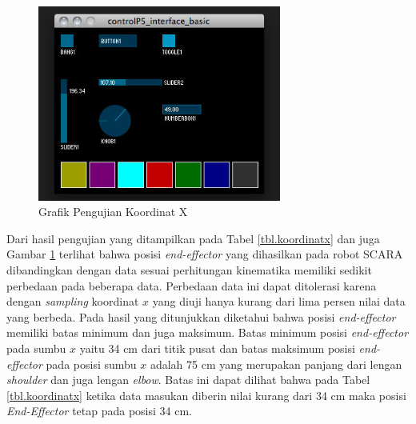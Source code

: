 	\begin{figure}[H]
	\centering
	\includegraphics[width=8cm]{gambar/controlp5.jpg}
	\caption{Grafik Pengujian Koordinat X}
	\label{pic.koordinatx}
\end{figure}

Dari hasil pengujian yang ditampilkan pada Tabel \ref{tbl.koordinatx} dan juga Gambar \ref{pic.koordinatx} terlihat bahwa posisi \textit{end-effector} yang dihasilkan pada robot SCARA dibandingkan dengan data sesuai perhitungan kinematika memiliki sedikit perbedaan pada beberapa data. Perbedaan data ini dapat ditolerasi karena dengan \textit{sampling} koordinat $x$ yang diuji hanya kurang dari lima persen nilai data yang berbeda. Pada hasil yang ditunjukkan diketahui bahwa posisi \textit{end-effector} memiliki batas minimum dan juga maksimum. Batas minimum posisi \textit{end-effector} pada sumbu $x$ yaitu 34 cm dari titik pusat dan batas maksimum posisi \textit{end-effector} pada posisi sumbu $x$ adalah 75 cm yang merupakan panjang dari lengan \textit{shoulder} dan juga lengan \textit{elbow}. Batas ini dapat dilihat bahwa pada Tabel \ref{tbl.koordinatx} ketika data masukan diberin nilai kurang dari 34 cm maka posisi \textit{End-Effector} tetap pada posisi 34 cm.

